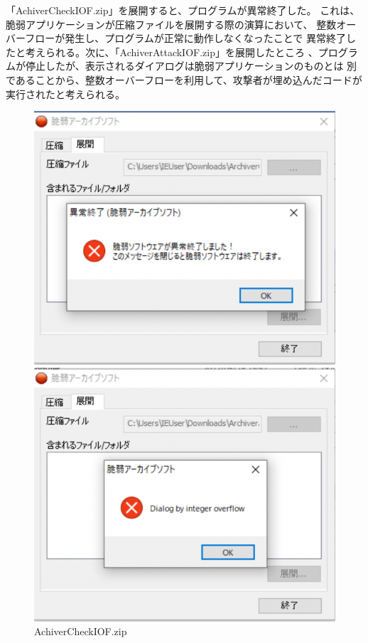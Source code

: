 \documentclass[dvipdfmx,autodetect-engine,titlepage]{jsarticle}
\begin{document}
「AchiverCheckIOF.zip」を展開すると、プログラムが異常終了した。
これは、脆弱アプリケーションが圧縮ファイルを展開する際の演算において、
整数オーバーフローが発生し、プログラムが正常に動作しなくなったことで
異常終了したと考えられる。次に、「AchiverAttackIOF.zip」を展開したところ
、プログラムが停止したが、表示されるダイアログは脆弱アプリケーションのものとは
別であることから、整数オーバーフローを利用して、攻撃者が埋め込んだコードが
実行されたと考えられる。



\begin{figure}[h]
  \centering
  \begin{minipage}[b]{0.45\linewidth}
  \begin{center}
    \includegraphics[keepaspectratio,scale=0.6]{pic4.png}
    \end{center}
    \caption{AchiverCheckIOF.zip}
  \end{minipage}
  \begin{minipage}[b]{0.45\linewidth}
  \begin{center}
    \includegraphics[keepaspectratio,scale=0.6]{pic5.png}

\end{center}
\end{minipage}
\end{figure}
\end{document}
